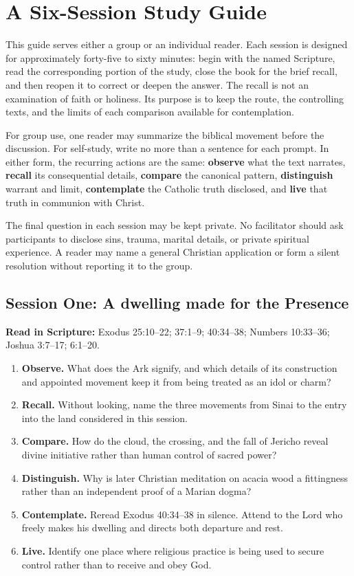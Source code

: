 \section{A Six-Session Study Guide}

This guide serves either a group or an individual reader.  Each session is
designed for approximately forty-five to sixty minutes: begin with the named
Scripture, read the corresponding portion of the study, close the book for the
brief recall, and then reopen it to correct or deepen the answer.  The recall
is not an examination of faith or holiness.  Its purpose is to keep the route,
the controlling texts, and the limits of each comparison available for
contemplation.

For group use, one reader may summarize the biblical movement before the
discussion.  For self-study, write no more than a sentence for each prompt.
In either form, the recurring actions are the same: \textbf{observe} what the
text narrates, \textbf{recall} its consequential details, \textbf{compare} the
canonical pattern, \textbf{distinguish} warrant and limit, \textbf{contemplate}
the Catholic truth disclosed, and \textbf{live} that truth in communion with
Christ.

The final question in each session may be kept private.  No facilitator should
ask participants to disclose sins, trauma, marital details, or private
spiritual experience.  A reader may name a general Christian application or
form a silent resolution without reporting it to the group.

\subsection{Session One: A dwelling made for the Presence}

\textbf{Read in Scripture:} Exodus 25:10--22; 37:1--9; 40:34--38;
Numbers 10:33--36; Joshua 3:7--17; 6:1--20.

\begin{enumerate}
  \item \textbf{Observe.} What does the Ark signify, and which details of its
  construction and appointed movement keep it from being treated as an idol
  or charm?
  \item \textbf{Recall.} Without looking, name the three movements from Sinai
  to the entry into the land considered in this session.
  \item \textbf{Compare.} How do the cloud, the crossing, and the fall of
  Jericho reveal divine initiative rather than human control of sacred power?
  \item \textbf{Distinguish.} Why is later Christian meditation on acacia wood a
  fittingness rather than an independent proof of a Marian dogma?
  \item \textbf{Contemplate.} Reread Exodus 40:34--38 in silence.  Attend to
  the Lord who freely makes his dwelling and directs both departure and rest.
  \item \textbf{Live.} Identify one place where religious practice is being
  used to secure control rather than to receive and obey God.
\end{enumerate}

